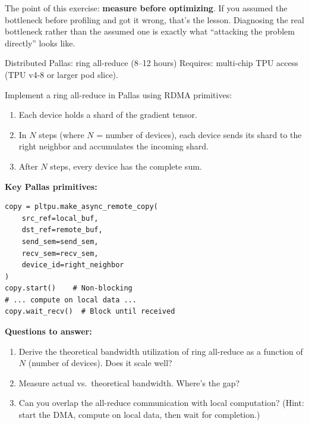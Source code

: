 The point of this exercise: \textbf{measure before optimizing}. If you assumed the bottleneck before profiling and got it wrong, that's the lesson. Diagnosing the real bottleneck rather than the assumed one is exactly what ``attacking the problem directly'' looks like.

\begin{exercise}{Distributed Pallas: ring all-reduce (8--12 hours)}
Requires: multi-chip TPU access (TPU v4-8 or larger pod slice).

Implement a ring all-reduce in Pallas using RDMA primitives:

\begin{enumerate}
  \item Each device holds a shard of the gradient tensor.
  \item In $N$ steps (where $N$ = number of devices), each device sends its shard to the right neighbor and accumulates the incoming shard.
  \item After $N$ steps, every device has the complete sum.
\end{enumerate}

\textbf{Key Pallas primitives:}
\begin{lstlisting}
copy = pltpu.make_async_remote_copy(
    src_ref=local_buf,
    dst_ref=remote_buf,
    send_sem=send_sem,
    recv_sem=recv_sem,
    device_id=right_neighbor
)
copy.start()    # Non-blocking
# ... compute on local data ...
copy.wait_recv()  # Block until received
\end{lstlisting}

\textbf{Questions to answer:}
\begin{enumerate}[label=\alph*)]
  \item Derive the theoretical bandwidth utilization of ring all-reduce as a function of $N$ (number of devices). Does it scale well?
  \item Measure actual vs.\ theoretical bandwidth. Where's the gap?
  \item Can you overlap the all-reduce communication with local computation? (Hint: start the DMA, compute on local data, then wait for completion.)
\end{enumerate}
\end{exercise}

